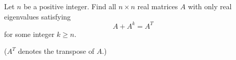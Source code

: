 Let \(n\) be a positive integer. Find all \(n\times n\) real matrices \(A\) with only real eigenvalues satisfying
\[
A + A^k = A^T
\]
for some integer \(k\ge n\).

(\(A^T\) denotes the transpose of \(A\).)
